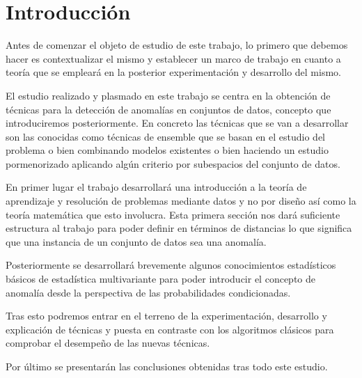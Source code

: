 \chapter{Introducción}

Antes de comenzar el objeto de estudio de este trabajo, lo primero que debemos hacer es contextualizar el mismo y establecer un marco de trabajo en cuanto a teoría que se empleará en la posterior experimentación y desarrollo del mismo. 

El estudio realizado y plasmado en este trabajo se centra en la obtención de técnicas para la detección de anomalías en conjuntos de datos, concepto que introduciremos posteriormente. En concreto las técnicas que se van a desarrollar son las conocidas como técnicas de ensemble que se basan en el estudio del problema o bien combinando modelos existentes o bien haciendo un estudio pormenorizado aplicando algún criterio por subespacios del conjunto de datos. 

En primer lugar el trabajo desarrollará una introducción a la teoría de aprendizaje y resolución de problemas mediante datos y no por diseño así como la teoría matemática que esto involucra. Esta primera sección nos dará suficiente estructura al trabajo para poder definir en términos de distancias lo que significa que una instancia de un conjunto de datos sea una anomalía.

Posteriormente se desarrollará brevemente algunos conocimientos estadísticos básicos de estadística multivariante para poder introducir el concepto de anomalía desde la perspectiva de las probabilidades condicionadas.

Tras esto podremos entrar en el terreno de la experimentación, desarrollo y explicación de técnicas y puesta en contraste con los algoritmos clásicos para comprobar el desempeño de las nuevas técnicas.

Por último se presentarán las conclusiones obtenidas tras todo este estudio.
